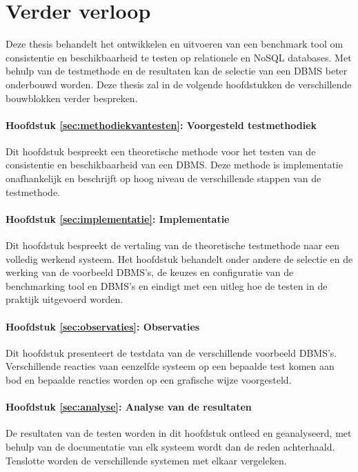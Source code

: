 \section{Verder verloop}
Deze thesis behandelt het ontwikkelen en uitvoeren van een benchmark tool om consistentie en beschikbaarheid te testen op relationele en NoSQL databases. Met behulp van de testmethode en de resultaten kan de selectie van een DBMS beter onderbouwd worden. Deze thesis zal in de volgende hoofdstukken de verschillende bouwblokken verder bespreken. 

\paragraph{Hoofdstuk \ref{sec:methodiekvantesten}: Voorgesteld testmethodiek} Dit hoofdstuk bespreekt een theoretische methode voor het testen van de consistentie en beschikbaarheid van een DBMS. Deze methode is implementatie onafhankelijk en beschrijft op hoog niveau de verschillende stappen van de testmethode. 

\paragraph{Hoofdstuk \ref{sec:implementatie}: Implementatie} Dit hoofdstuk bespreekt de vertaling van de theoretische testmethode naar een volledig werkend systeem. Het hoofdstuk behandelt onder andere de selectie en de werking van de voorbeeld DBMS's, de keuzes en configuratie van de benchmarking tool en DBMS's en eindigt met een uitleg hoe de testen in de praktijk uitgevoerd worden.

\paragraph{Hoofdstuk \ref{sec:observaties}: Observaties} Dit hoofdstuk presenteert de testdata van de verschillende voorbeeld DBMS's. Verschillende reacties vaan eenzelfde systeem op een bepaalde test komen aan bod en bepaalde reacties worden op een grafische wijze voorgesteld. 

\paragraph{Hoofdstuk \ref{sec:analyse}: Analyse van de resultaten} De resultaten van de testen worden in dit hoofdstuk ontleed en geanalyseerd, met behulp van de documentatie van elk systeem wordt dan de reden achterhaald. Tenslotte worden de verschillende systemen met elkaar vergeleken. 

